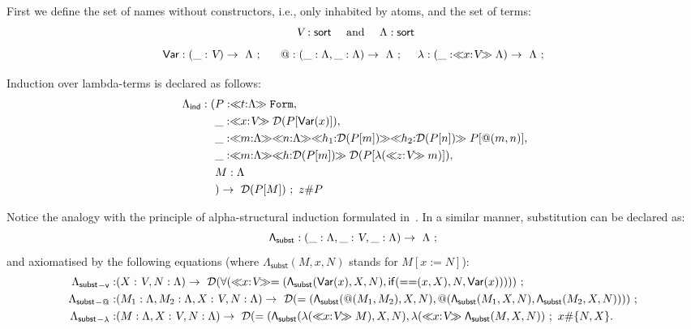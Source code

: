 \documentclass[11pt,a4paper]{amsart}
\newcounter{s}
\newcommand{\dabsort}[3]{\ensuremath{\ll\!\!\ntyping{#1}{#2}\!\!\gg #3}}
\newcommand{\concr}[2]{#1[#2]}
\newcommand{\typing}[2]{\ensuremath{#1 : #2}}
\newcommand{\ntyping}[2]{\ensuremath{#1{:}#2}}
\newcommand{\fresh}[2]{#1 \# #2}
\newcommand{\sort}{\ensuremath{\mathsf{sort}}}
\newcommand{\fconstrdecl}[4]{\ensuremath{#1 : #2 \rightarrow\ #3\ ;\ #4}}
\newcommand{\form}{\texttt{Form}}
\newcommand{\prf}{\ensuremath{\mathcal{D}}}
\newcommand{\name}{\textsl{V}}
\begin{document}
First we define the set of names without constructors, i.e., only inhabited by atoms, and
the set of terms:
\[\typing{\name}{\sort} \quad \text{ and }\quad \typing{\Lambda}{\sort}
\]
\begingroup
\small
\[%
\fconstrdecl{\mathsf{Var}}{(\typing{\_}{\name})}{\Lambda}{}\
\quad \fconstrdecl{@}{(\typing{\_}{\Lambda},\typing{\_}{\Lambda})}{\Lambda}{} 
\quad \fconstrdecl{\lambda}{(\typing{\_}{\dabsort{x}{\name}{\Lambda}})}{\Lambda}{}
\]
\endgroup

Induction over lambda-terms is declared as follows:
\[
\begin{aligned}\fconstrdecl{\Lambda_{\mathsf{ind}}}
{(\typing{&P}{\dabsort{t}{\Lambda}{\form}},\\
&\typing{\_}{\dabsort{x}{\name}{\prf{(\concr{P}{\mathsf{Var}(x)})}}},\\
&\typing{\_}{\dabsort{m}{\Lambda}
            {\dabsort{n}{\Lambda}
            {\dabsort{h_1}{\prf(\concr{P}{m})}}
            {\dabsort{h_2}{\prf(\concr{P}{n})}}
            \concr{P}{@(m,n)}
            }},\\
&\typing{\_}{\dabsort{m}{\Lambda}
            {\dabsort{h}{\prf{(\concr{P}{m})}}
            {\prf{(\concr{P}{\lambda(\dabsort{z}{\name}{m})})}}
            }},\\
&\typing{M}{\Lambda}\\
&)}{\prf{(\concr{P}{M}})}{\fresh{z}{P}}
\end{aligned}
\]

Notice the analogy with the principle of alpha-structural induction formulated in~\cite{pitts:alpsri}. In a similar manner,
substitution can be declared as:
\newcommand{\Lamsubst}{\Lambda_{\mathsf{subst}}}
\[\fconstrdecl{\mathsf{\Lamsubst}}{(\typing{\_}{\Lambda},\typing{\_}{\name},\typing{\_}{\Lambda})}{\Lambda}{}\]
%
and axiomatised by the following equations (where $\Lamsubst(M, x, N)$ stands for  $M[x := N]$):
\begingroup
\small
\[
\begin{aligned}
\fconstrdecl{{\Lamsubst}_{\mathsf{-v}}}{&(\typing{X}{\name},\typing{N}{\Lambda})}
{\prf{(\mathsf{\forall}(
                         \dabsort{x}{\name}
                         {=( 
                             \mathsf{\Lamsubst}(\mathsf{Var}(x), X, N),
                             \mathsf{if}(\mathsf{==}(x, X),N,\mathsf{Var}(x))
                            )}))}}
{}    
\\
\fconstrdecl{{\Lamsubst}_{-@}}{&(\typing{M_{1}}{\Lambda}, \typing{M_{2}}{\Lambda}, \typing{X}{\name},\typing{N}{\Lambda})}
{\prf{(=(\mathsf{\Lamsubst}(@(M_{1}, M_{2}) , X, N),
                   @(\mathsf{\Lamsubst}(M_{1}, X, N), 
                     \mathsf{\Lamsubst}(M_{2}, X, N))   
                  ))}}
{}
\\
\fconstrdecl{{\Lamsubst}_{-\lambda}}{&(\typing{M}{\Lambda}, \typing{X}{\name},\typing{N}{\Lambda})}
{\prf{(=(\mathsf{\Lamsubst}(\lambda(\dabsort{x}{\name}{M}), X, N),
\lambda(\dabsort{x}{\name}{\mathsf{\Lamsubst}(M, X, N))}}}
{\fresh{x}{\{N, X\}}}.
\end{aligned}
\]
\endgroup
\end{document}
